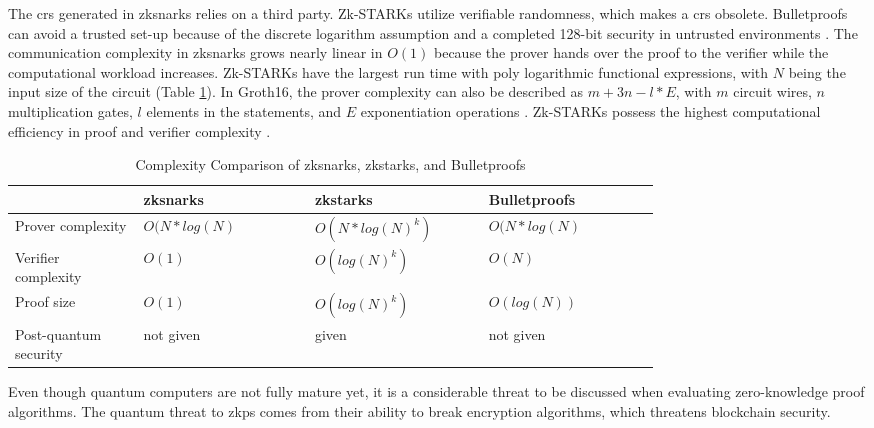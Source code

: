 The \acrshort{crs} generated in \acrshort{zksnark}s relies on a third party. Zk-STARKs utilize verifiable randomness, which makes a \acrshort{crs} obsolete. Bulletproofs can avoid a trusted set-up because of the discrete logarithm assumption and a completed 128-bit security in untrusted environments \citep{Huangetal}. The communication complexity in \acrshort{zksnark}s grows nearly linear in \(O(1)\) because the prover hands over the proof to the verifier while the computational workload increases. Zk-STARKs have the largest run time with poly logarithmic functional expressions, with \(N\) being the input size of the circuit (Table \ref{tab:complexity}). In Groth16, the prover complexity can also be described as \(m + 3n - l*E\), with \(m\) circuit wires, \(n\) multiplication gates, \(l\) elements in the statements, and \(E\) exponentiation operations \citep{Groth2016OnTS}. Zk-STARKs possess the highest computational efficiency in proof and verifier complexity \citep{gongetal}.
\setlength{\tabcolsep}{2ex}
\renewcommand{\arraystretch}{1.5}%
\begin{table}[ht]
	\centering
	    \caption{Complexity Comparison of \acrshort{zksnark}s, \acrshort{zkstark}s, and Bulletproofs}
		\begin{tabular}{| m{0.15\linewidth} | m{0.2\linewidth} |              m{0.2\linewidth}      | m{0.2\linewidth}|} \hline
		\textbf{} & \textbf{\acrshort{zksnark}s} & \textbf{\acrshort{zkstark}s} &\textbf{Bulletproofs}       \\ \hline
            Prover \newline complexity & \(O(N*log(N)\) & \(O(N*log(N)^k)\) & \(O(N*log(N)\) \\  \hline
            Verifier \newline complexity & \(O(1)\) & \(O(log(N)^k)\) & \(O(N)\) \\ \hline 
            Proof size & \(O(1)\) & \(O(log(N)^k)\) &  \(O(log(N))\)\\  \hline
            Post-quantum security &  not given & given & not given\\  \hline 
	\end{tabular}
\label{tab:complexity}
\end{table}

Even though quantum computers are not fully mature yet, it is a considerable threat to be discussed when evaluating zero-knowledge proof algorithms. The quantum threat to \acrshort{zkp}s comes from their ability to break encryption algorithms, which threatens blockchain security.

